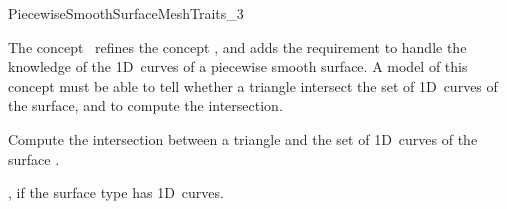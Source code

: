 
\begin{ccRefConcept}{PiecewiseSmoothSurfaceMeshTraits_3}

\ccDefinition
  
The concept \ccRefName\ refines the concept , and
adds the requirement to handle the knowledge of the 1D~curves of a
piecewise smooth surface. A model of this concept must be able to tell
whether a triangle intersect the set of 1D~curves of the surface, and to
compute the intersection.

\ccGeneralizes
{}

\ccTypes


{}  %


{ Compute the intersection between a triangle and the set of 1D~curves of
  the surface . }

\ccHasModels

, if the surface type
 has 1D~curves.

\ccSeeAlso
{}\\

\end{ccRefConcept}


